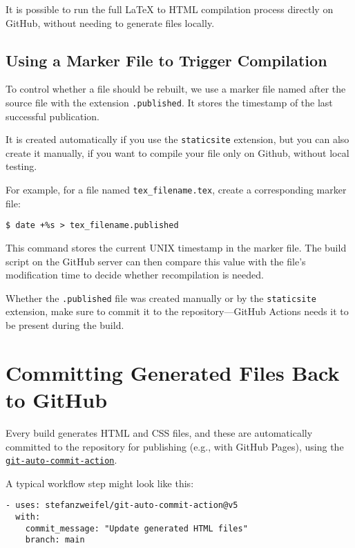 \documentclass{article}
\begin{document}
It is possible to run the full \LaTeX{} to HTML compilation process directly on GitHub, 
without needing to generate files locally.

\subsection{Using a Marker File to Trigger Compilation}

To control whether a file should be rebuilt, we use a marker file named after the source file 
with the extension \texttt{.published}. It stores the timestamp of the last successful publication.

It is created automatically if you use the \texttt{staticsite} extension, but you can also create it manually,
if you want to compile your file only on Github, without local testing.

For example, for a file named \texttt{tex\_filename.tex}, create a corresponding marker file:

\begin{verbatim}
$ date +%s > tex_filename.published
\end{verbatim}

This command stores the current UNIX timestamp in the marker file. The build script 
on the GitHub server can then compare this value with the file's modification time 
to decide whether recompilation is needed.

Whether the \texttt{.published} file was created manually or by the \texttt{staticsite}
extension, make sure to commit it to the repository—GitHub Actions needs it to
be present during the build.


\section{Committing Generated Files Back to GitHub}

Every build generates HTML and CSS files, and these are automatically committed
to the repository for publishing (e.g., with GitHub Pages), using the
\href{https://github.com/stefanzweifel/git-auto-commit-action}{\texttt{git-auto-commit-action}}.

A typical workflow step might look like this:

\begin{verbatim}
- uses: stefanzweifel/git-auto-commit-action@v5
  with:
    commit_message: "Update generated HTML files"
    branch: main
\end{verbatim}
\end{document}
